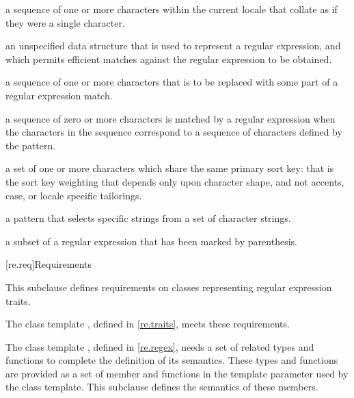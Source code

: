 %
%
a sequence of one or more characters within the
current locale that collate as if they were a single character.

%
an unspecified data structure that is used to
represent a regular expression, and which permits efficient matches
against the regular expression to be obtained.

%
a sequence of one or more characters that is to be
replaced with some part of a regular expression match.

%
%
a sequence of zero or more characters is matched by
a regular expression when the characters in the sequence
correspond to a sequence of characters defined by the pattern.

%
%
a set of one or more characters which
share the same primary sort key: that is the sort key weighting that
depends only upon character shape, and not accents, case, or
locale specific tailorings.

a pattern that selects specific strings
from a set of character strings.

%
a subset of a regular expression that has
been marked by parenthesis.

[re.req]{Requirements}

\pnum
This subclause defines requirements on classes representing regular
expression traits.
\begin{note}
The class template
, defined in \ref{re.traits},
meets these requirements.
\end{note}

\pnum
The class template , defined in
\ref{re.regex}, needs a set of related types and
functions to complete the definition of its semantics. These types
and functions are provided as a set of member  and functions
in the template parameter  used by the  class
template. This subclause defines the semantics of these
members.

